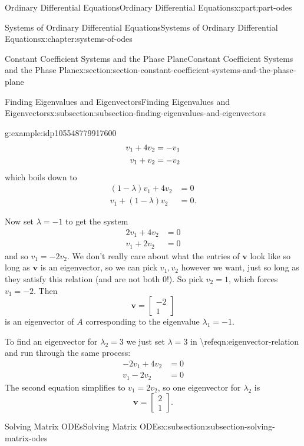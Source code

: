 \documentclass[oneside,10pt,]{book}
\numberwithin{equation}{part}
\renewcommand{\vec}[1]{\mathbf{#1}}
\newcommand{\amp}{&}
\begin{document}
\begin{partptx}{Ordinary Differential Equations}{}{Ordinary Differential Equations}{}{}{x:part:part-odes}
\begin{chapterptx}{Systems of Ordinary Differential Equations}{}{Systems of Ordinary Differential Equations}{}{}{x:chapter:systems-of-odes}
\begin{sectionptx}{Constant Coefficient Systems and the Phase Plane}{}{Constant Coefficient Systems and the Phase Plane}{}{}{x:section:section-constant-coefficient-systems-and-the-phase-plane}
\begin{subsectionptx}{Finding Eigenvalues and Eigenvectors}{}{Finding Eigenvalues and Eigenvectors}{}{}{x:subsection:subsection-finding-eigenvalues-and-eigenvectors}
\begin{example}{}{g:example:idp105548779917600}
\begin{align}
v_{1}+4v_{2}\amp =-v_{1}\notag\\
v_{1}+v_{2} \amp = -v_{2}\notag
\end{align}
which boils down to%
\begin{align*}
(1-\lambda)v_{1}+4v_{2} \amp = 0\\
v_{1} + (1-\lambda)v_{2} \amp = 0.
\end{align*}
%
\par
Now set \(\lambda = -1\) to get the system%
\begin{align*}
2v_{1} + 4v_{2} \amp = 0\\
v_{1} + 2v_{2} \amp = 0
\end{align*}
and so \(v_{1} = -2v_{2}\). We don't really care about what the entries of \(\vec{v}\) look like so long as \(\vec{v}\) is an eigenvector, so we can pick \(v_{1},v_{2}\) however we want, just so long as they satisfy this relation (and are not both \(0\)!). So pick \(v_{2} = 1\), which forces \(v_{1} = -2\). Then%
\begin{equation*}
\vec{v} = \begin{bmatrix}-2\\1\end{bmatrix}
\end{equation*}
is an eigenvector of \(A\) corresponding to the eigenvalue \(\lambda_{1} = -1\).%
\par
To find an eigenvector for \(\lambda_{2} = 3\) we just set \(\lambda  = 3\) in \textbackslash{}ref\textbraceleft{}eqn:eigenvector-relation\textbraceright{} and run through the same process:%
\begin{align*}
-2v_{1}+4v_{2} \amp = 0\\
v_{1} - 2v_{2} \amp = 0
\end{align*}
The second equation simplifies to \(v_{1} = 2v_{2}\), so one eigenvector for \(\lambda_{2}\) is%
\begin{equation*}
\vec{v} = \begin{bmatrix}2 \\ 1\end{bmatrix}.
\end{equation*}
%
\end{example}
\end{subsectionptx}
%
%
\typeout{************************************************}
\typeout{************************************************}
%
\begin{subsectionptx}{Solving Matrix ODEs}{}{Solving Matrix ODEs}{}{}{x:subsection:subsection-solving-matrix-odes}

\end{subsectionptx}
\end{sectionptx}
\end{chapterptx}
\end{partptx}
\end{document}
